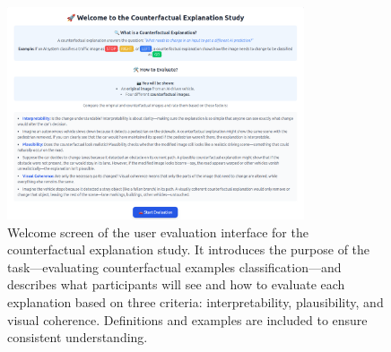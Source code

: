 \begin{figure}
    \centering
    \includegraphics[width=0.78\textwidth]{img/web_app_screenshots/form_ui_info.png}
    \caption[Welcome screen of user study interface]{%
Welcome screen of the user evaluation interface for the counterfactual explanation study. It introduces the purpose of the task—evaluating counterfactual examples classification—and describes what participants will see and how to evaluate each explanation based on three criteria: interpretability, plausibility, and visual coherence. Definitions and examples are included to ensure consistent understanding.}
    \label{fig:app:form_ui}
\end{figure}